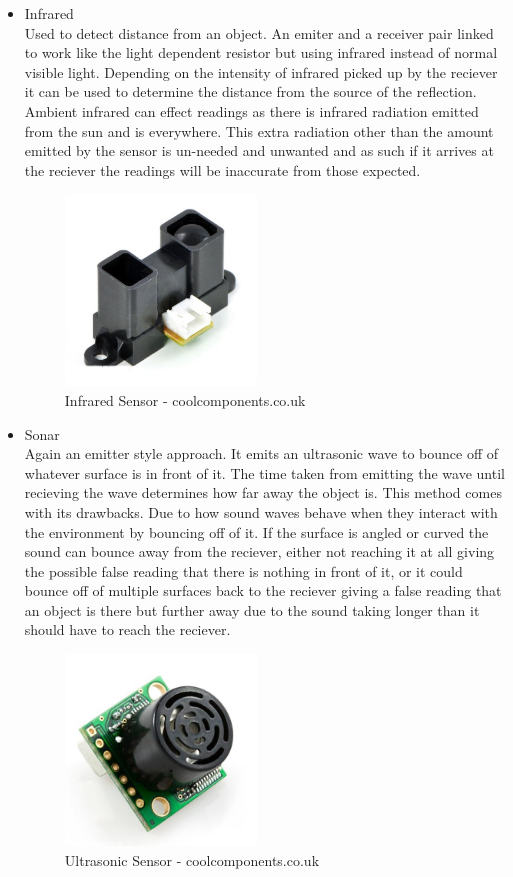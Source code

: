 \begin{itemize}
\item Infrared
\\Used to detect distance from an object.  An emiter and a receiver pair linked to work like the light dependent resistor but using infrared instead of normal visible light.  Depending on the intensity of infrared picked up by the reciever it can be used to determine the distance from the source of the reflection.  Ambient infrared can effect readings as there is infrared radiation emitted from the sun and is everywhere.  This extra radiation other than the amount emitted by the sensor is un-needed and unwanted and as such if it arrives at the reciever the readings will be inaccurate from those expected.
\begin{figure}[h]
\centering
        \includegraphics[width=2.0in] {Images/ir.jpg}
        \caption{Infrared Sensor - coolcomponents.co.uk}
        \label{Infrared Sensor}
\end{figure}

\item Sonar
\\Again an emitter style approach.  It emits an ultrasonic wave to bounce off of whatever surface is in front of it.  The time taken from emitting the wave until recieving the wave determines how far away the object is.  This method comes with its drawbacks.  Due to how sound waves behave when they interact with the environment by bouncing off of it.  If the surface is angled or curved the sound can bounce away from the reciever, either not reaching it at all giving the possible false reading that there is nothing in front of it, or it could bounce off of multiple surfaces back to the reciever giving a false reading that an object is there but further away due to the sound taking longer than it should have to reach the reciever.
\begin{figure}[h]
\centering
        \includegraphics[width=2.0in] {Images/sonar.jpg}
        \caption{Ultrasonic Sensor - coolcomponents.co.uk}
        \label{Ultrasonic Sensor}
\end{figure}

\end{itemize}
